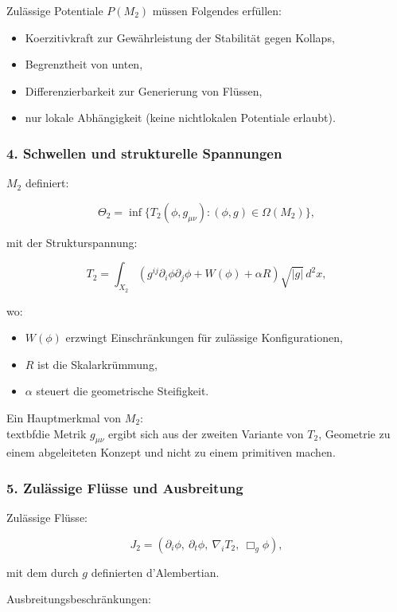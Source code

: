 Zulässige Potentiale $P(M_2)$ müssen Folgendes erfüllen:

\begin{itemize}
    \item Koerzitivkraft zur Gewährleistung der Stabilität gegen Kollaps,
    \item Begrenztheit von unten,
    \item Differenzierbarkeit zur Generierung von Flüssen,
    \item nur lokale Abhängigkeit (keine nichtlokalen Potentiale erlaubt).
\end{itemize}

\subsubsection*{4. Schwellen und strukturelle Spannungen}

$M_2$ definiert:

\[
\Theta_2 = \inf \{ T_2(\phi, g_{\mu\nu}) : (\phi, g) \in \Omega(M_2) \},
\]

mit der Strukturspannung:

\[
T_2 = \int_{X_2}
\left(
g^{ij} \partial_i \phi \partial_j \phi
+ W(\phi)
+ \alpha R
\right)
\sqrt{|g|}\, d^2x,
\]

wo:

\begin{itemize}
    \item $W(\phi)$ erzwingt Einschränkungen für zulässige Konfigurationen,
    \item $R$ ist die Skalarkrümmung,
    \item $\alpha$ steuert die geometrische Steifigkeit.
\end{itemize}

Ein Hauptmerkmal von $M_2$:
\\textbf{die Metrik $g_{\mu\nu}$ ergibt sich aus der zweiten Variante von $T_2$},
Geometrie zu einem abgeleiteten Konzept und nicht zu einem primitiven machen.

\subsubsection*{5. Zulässige Flüsse und Ausbreitung}

Zulässige Flüsse:

\[
J_2 = (\partial_i \phi,\ \partial_t \phi,\ \nabla_i T_2,\ \Box_g \phi),
\]

mit dem durch $g$ definierten d'Alembertian.

Ausbreitungsbeschränkungen:

